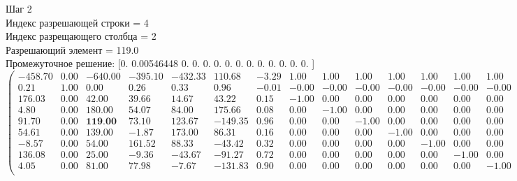 \documentclass{article}
\begin{document}
\begin{flushleft}
    Шаг 2\\
Индекс разрешающей строки = 4\\
Индекс разрещающего столбца = 2\\
Разрешающий элемент = 119.0\\
Промежуточное решение:
 [0.         0.00546448 0.         0.         0.         0.
 0.         0.         0.         0.         0.         0.
 0.         0.        ]
\begin{equation*}
\begin{pmatrix}
-458.70 & 0.00 & -640.00 & -395.10 & -432.33 &  110.68 & -3.29 &  1.00 &  1.00 &  1.00 &  1.00 &  1.00 &  1.00 &  1.00 &  4.29 & 0.00 & 0.00 & 0.00 & 0.00 & 0.00 & 0.00 & 0.00 & -3.71 \\
    0.21 & 1.00 &    0.00 &    0.26 &    0.33 &    0.96 & -0.01 & -0.00 & -0.00 & -0.00 & -0.00 & -0.00 & -0.00 & -0.00 &  0.01 & 0.00 & 0.00 & 0.00 & 0.00 & 0.00 & 0.00 & 0.00 &  0.01 \\
  176.03 & 0.00 &   42.00 &   39.66 &   14.67 &   43.22 &  0.15 & -1.00 &  0.00 &  0.00 &  0.00 &  0.00 &  0.00 &  0.00 & -0.15 & 1.00 & 0.00 & 0.00 & 0.00 & 0.00 & 0.00 & 0.00 &  0.85 \\
    4.80 & 0.00 &  180.00 &   54.07 &   84.00 &  175.66 &  0.08 &  0.00 & -1.00 &  0.00 &  0.00 &  0.00 &  0.00 &  0.00 & -0.08 & 0.00 & 1.00 & 0.00 & 0.00 & 0.00 & 0.00 & 0.00 &  0.92 \\
   91.70 & 0.00 &  \textbf{119.00} &   73.10 &  123.67 & -149.35 &  0.96 &  0.00 &  0.00 & -1.00 &  0.00 &  0.00 &  0.00 &  0.00 & -0.96 & 0.00 & 0.00 & 1.00 & 0.00 & 0.00 & 0.00 & 0.00 &  0.04 \\
   54.61 & 0.00 &  139.00 &   -1.87 &  173.00 &   86.31 &  0.16 &  0.00 &  0.00 &  0.00 & -1.00 &  0.00 &  0.00 &  0.00 & -0.16 & 0.00 & 0.00 & 0.00 & 1.00 & 0.00 & 0.00 & 0.00 &  0.84 \\
   -8.57 & 0.00 &   54.00 &  161.52 &   88.33 &  -43.42 &  0.32 &  0.00 &  0.00 &  0.00 &  0.00 & -1.00 &  0.00 &  0.00 & -0.32 & 0.00 & 0.00 & 0.00 & 0.00 & 1.00 & 0.00 & 0.00 &  0.68 \\
  136.08 & 0.00 &   25.00 &   -9.36 &  -43.67 &  -91.27 &  0.72 &  0.00 &  0.00 &  0.00 &  0.00 &  0.00 & -1.00 &  0.00 & -0.72 & 0.00 & 0.00 & 0.00 & 0.00 & 0.00 & 1.00 & 0.00 &  0.28 \\
    4.05 & 0.00 &   81.00 &   77.98 &   -7.67 & -131.83 &  0.90 &  0.00 &  0.00 &  0.00 &  0.00 &  0.00 &  0.00 & -1.00 & -0.90 & 0.00 & 0.00 & 0.00 & 0.00 & 0.00 & 0.00 & 1.00 &  0.10 \\
\end{pmatrix}
\end{equation*}
\end{flushleft}
\end{document}
